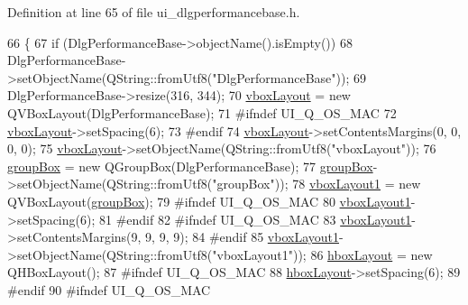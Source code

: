 Definition at line 65 of file ui\+\_\+dlgperformancebase.\+h.


\begin{DoxyCode}
66     \{
67         \textcolor{keywordflow}{if} (DlgPerformanceBase->objectName().isEmpty())
68             DlgPerformanceBase->setObjectName(QString::fromUtf8(\textcolor{stringliteral}{"DlgPerformanceBase"}));
69         DlgPerformanceBase->resize(316, 344);
70         \hyperlink{classUi__DlgPerformanceBase_abae379ebe3e2f77707d6621ce00a7236}{vboxLayout} = \textcolor{keyword}{new} QVBoxLayout(DlgPerformanceBase);
71 \textcolor{preprocessor}{#ifndef UI\_Q\_OS\_MAC}
72         \hyperlink{classUi__DlgPerformanceBase_abae379ebe3e2f77707d6621ce00a7236}{vboxLayout}->setSpacing(6);
73 \textcolor{preprocessor}{#endif}
74         \hyperlink{classUi__DlgPerformanceBase_abae379ebe3e2f77707d6621ce00a7236}{vboxLayout}->setContentsMargins(0, 0, 0, 0);
75         \hyperlink{classUi__DlgPerformanceBase_abae379ebe3e2f77707d6621ce00a7236}{vboxLayout}->setObjectName(QString::fromUtf8(\textcolor{stringliteral}{"vboxLayout"}));
76         \hyperlink{classUi__DlgPerformanceBase_a95446d4eb7ed6bca1d9ab130459e2026}{groupBox} = \textcolor{keyword}{new} QGroupBox(DlgPerformanceBase);
77         \hyperlink{classUi__DlgPerformanceBase_a95446d4eb7ed6bca1d9ab130459e2026}{groupBox}->setObjectName(QString::fromUtf8(\textcolor{stringliteral}{"groupBox"}));
78         \hyperlink{classUi__DlgPerformanceBase_a39bb4caf4acbc4131727a12ec7bff223}{vboxLayout1} = \textcolor{keyword}{new} QVBoxLayout(\hyperlink{classUi__DlgPerformanceBase_a95446d4eb7ed6bca1d9ab130459e2026}{groupBox});
79 \textcolor{preprocessor}{#ifndef UI\_Q\_OS\_MAC}
80         \hyperlink{classUi__DlgPerformanceBase_a39bb4caf4acbc4131727a12ec7bff223}{vboxLayout1}->setSpacing(6);
81 \textcolor{preprocessor}{#endif}
82 \textcolor{preprocessor}{#ifndef UI\_Q\_OS\_MAC}
83         \hyperlink{classUi__DlgPerformanceBase_a39bb4caf4acbc4131727a12ec7bff223}{vboxLayout1}->setContentsMargins(9, 9, 9, 9);
84 \textcolor{preprocessor}{#endif}
85         \hyperlink{classUi__DlgPerformanceBase_a39bb4caf4acbc4131727a12ec7bff223}{vboxLayout1}->setObjectName(QString::fromUtf8(\textcolor{stringliteral}{"vboxLayout1"}));
86         \hyperlink{classUi__DlgPerformanceBase_af14f550725818437cba053b3da16ef8a}{hboxLayout} = \textcolor{keyword}{new} QHBoxLayout();
87 \textcolor{preprocessor}{#ifndef UI\_Q\_OS\_MAC}
88         \hyperlink{classUi__DlgPerformanceBase_af14f550725818437cba053b3da16ef8a}{hboxLayout}->setSpacing(6);
89 \textcolor{preprocessor}{#endif}
90 \textcolor{preprocessor}{#ifndef UI\_Q\_OS\_MAC}

\end{DoxyCode}
